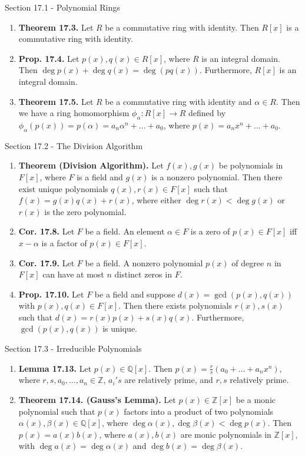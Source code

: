 \documentclass[12pt]{article}
\theoremstyle{definition}
\theoremstyle{named}
\begin{document}
\begin{section}{Section 17.1 - Polynomial Rings}
    \begin{enumerate}
        \item \textbf{Theorem 17.3. } Let $R$ be a commutative ring with identity. Then $R[x]$ is a commutative ring with identity. 
        \item \textbf{Prop. 17.4. } Let $p(x),q(x) \in R[x]$, where $R$ is an integral domain. Then $\deg p(x) + \deg q(x) = \deg(pq(x))$. Furthermore, $R[x]$ is an integral domain. 
        \item \textbf{Theorem 17.5. } Let $R$ be a commutative ring with identity and $\alpha \in R$. Then we have a ring homomorphism $\phi_\alpha: R[x] \to R$ defined by $\phi_\alpha(p(x)) = p(\alpha) = a_n\alpha^n + \dots + a_0$, where $p(x) = a_nx^n + \dots + a_0$. 
    \end{enumerate}
\end{section}

\begin{section}{Section 17.2 - The Division Algorithm}
    \begin{enumerate}
        \item \textbf{Theorem (Division Algorithm). } Let $f(x),g(x)$ be polynomials in $F[x]$, where $F$ is a field and $g(x)$ is a nonzero polynomial. Then there exist unique polynomials $q(x),r(x) \in F[x]$ such that $f(x) = g(x)q(x)+r(x)$, where either $\deg r(x) < \deg g(x)$ or $r(x)$ is the zero polynomial. 
        \item \textbf{Cor. 17.8. } Let $F$ be a field. An element $\alpha \in F$ is a zero of $p(x) \in F[x]$ iff $x-\alpha$ is a factor of $p(x) \in F[x]$. 
        \item \textbf{Cor. 17.9. } Let $F$ be a field. A nonzero polynomial $p(x)$ of degree $n$ in $F[x]$ can have at most $n$ distinct zeros in $F$. 
        \item \textbf{Prop. 17.10. } Let $F$ be a field and suppose $d(x) = \gcd(p(x),q(x))$ with $p(x),q(x) \in F[x]$. Then there exists polynomials $r(x),s(x)$ such that $d(x) = r(x)p(x) + s(x)q(x)$. Furthermore, $\gcd(p(x),q(x))$ is unique. 
    \end{enumerate}
\end{section}

\begin{section}{Section 17.3 - Irreducible Polynomials}
    \begin{enumerate}
        \item \textbf{Lemma 17.13. } Let $p(x) \in \mathbb{Q}[x]$. Then $p(x) = \frac{r}{s}(a_0 + \dots + a_nx^n)$, where $r,s,a_0,\dots,a_n \in \mathbb{Z}$, $a_i's$ are relatively prime, and $r,s$ relatively prime. 
        \item \textbf{Theorem 17.14. (Gauss's Lemma). } Let $p(x) \in \mathbb{Z}[x]$ be a monic polynomial such that $p(x)$ factors into a product of two polynomials $\alpha(x),\beta(x) \in \mathbb{Q}[x]$, where $\deg\alpha(x), \deg\beta(x) < \deg p(x)$. Then $p(x) = a(x)b(x)$, where $a(x),b(x)$ are monic polynomials in $\mathbb{Z}[x]$, with $\deg a(x) = \deg\alpha(x)$ and $\deg b(x) = \deg\beta(x)$.  
    \end{enumerate}
\end{section}
\end{document}
